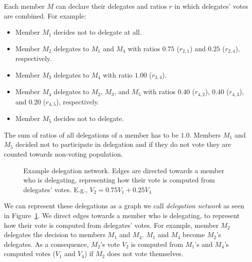 \documentclass{sigchi}
\begin{document}
Each member $M$ can declare their delegates and ratios $r$ in which delegates' votes are combined. For example:

\begin{itemize}
\item Member $M_1$ decides not to delegate at all.
\item Member $M_2$ delegates to $M_1$ and $M_4$ with ratios $0.75$ ($r_{2,1}$) and $0.25$ ($r_{2,4}$), respectively.
\item Member $M_3$ delegates to $M_4$ with ratio $1.00$ ($r_{3,4}$).
\item Member $M_4$ delegates to $M_2$, $M_3$, and $M_5$ with ratios $0.40$ ($r_{4,2}$), $0.40$ ($r_{4,3}$), and $0.20$ ($r_{4,5}$), respectively.
\item Member $M_5$ decides not to delegate.
\end{itemize}

The sum of ratios of all delegations of a member has to be $1.0$.
Members $M_1$ and $M_5$ decided not to participate in delegation and if they do not vote they are
counted towards non-voting population.

\begin{figure}
  \centering
  \caption{Example delegation network. Edges are directed towards a member who is delegating, representing how their
  vote is computed from delegates' votes. E.g., $V_2 = 0.75 V_1 + 0.25 V_4$}\label{fig:delegation-network}
\end{figure}

We can represent these delegations as a graph we call \emph{delegation network} as seen in
Figure~\ref{fig:delegation-network}.
We direct edges towards a member who is delegating, to represent how their vote is computed from delegates' votes.
For example, member $M_2$ delegates the decision to members $M_1$ and $M_4$.
$M_1$ and $M_4$ become $M_2$'s delegates.
As a consequence, $M_2$'s vote $V_2$ is computed from $M_1$'s and $M_4$'s computed votes ($V_1$ and $V_4$)
if $M_2$ does not vote themselves.
\end{document}
